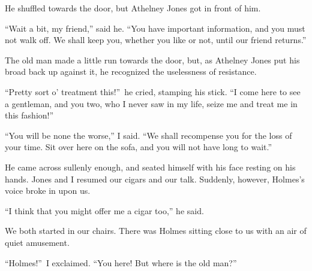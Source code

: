 \documentclass[12pt,english,oneside]{book}
\begin{document}
He shuffled towards the door, but Athelney Jones got in front of him.

{}``Wait a bit, my friend,'' said he. {}``You have important information,
and you must not walk off. We shall keep you, whether you like or
not, until our friend returns.''

The old man made a little run towards the door, but, as Athelney Jones
put his broad back up against it, he recognized the uselessness of
resistance.

{}``Pretty sort o' treatment this!''\ he cried, stamping his stick.
{}``I come here to see a gentleman, and you two, who I never saw
in my life, seize me and treat me in this fashion!''

{}``You will be none the worse,'' I said. {}``We shall recompense
you for the loss of your time. Sit over here on the sofa, and you
will not have long to wait.''

He came across sullenly enough, and seated himself with his face resting
on his hands. Jones and I resumed our cigars and our talk. Suddenly,
however, Holmes's voice broke in upon us.

{}``I think that you might offer me a cigar too,'' he said.

We both started in our chairs. There was Holmes sitting close to us
with an air of quiet amusement.

{}``Holmes!''\ I exclaimed. {}``You here! But where is the old
man?''
\end{document}
